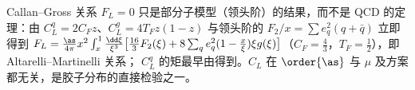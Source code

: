 \noindent
Callan--Gross 关系 $F_L=0$ 只是部分子模型（领头阶）的结果，而不是 QCD 的定理：由 $C_L^q=2C_Fz$、$C_L^g=4T_Fz(1-z)$ 与领头阶的 $F_2/x=\sum e_q^2(q+\bar q)$ 立即得到
$F_L=\frac{\as}{4\pi}x^2\int_x^1\frac{\dd\xi}{\xi^3}\big[\frac{16}3F_2(\xi)+8\sum_qe_q^2(1-\frac x\xi)\xi g(\xi)\big]$（$C_F=\frac43$，$T_F=\frac12$），即 Altarelli--Martinelli 关系\cite{AltarelliMartinelli1978}；
$C_L^q$ 的矩最早由\cite{Zee:1974du}得到。$C_L$ 在 $\order{\as}$ 与 $\mu$ 及方案都无关，是胶子分布的直接检验之一。
